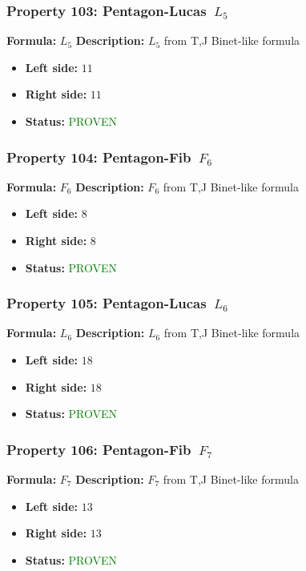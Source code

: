 \subsubsection*{Property 103: Pentagon-Lucas~$L_{5}$}
\textbf{Formula:} $L_5$
\textbf{Description:} $L_{5}$ from T,J Binet-like formula

\begin{itemize}
\item \textbf{Left side:} $11$
\item \textbf{Right side:} $11$
\item \textbf{Status:} \textcolor{green}{PROVEN}
\end{itemize}

\subsubsection*{Property 104: Pentagon-Fib~$F_{6}$}
\textbf{Formula:} $F_6$
\textbf{Description:} $F_{6}$ from T,J Binet-like formula

\begin{itemize}
\item \textbf{Left side:} $8$
\item \textbf{Right side:} $8$
\item \textbf{Status:} \textcolor{green}{PROVEN}
\end{itemize}

\subsubsection*{Property 105: Pentagon-Lucas~$L_{6}$}
\textbf{Formula:} $L_6$
\textbf{Description:} $L_{6}$ from T,J Binet-like formula

\begin{itemize}
\item \textbf{Left side:} $18$
\item \textbf{Right side:} $18$
\item \textbf{Status:} \textcolor{green}{PROVEN}
\end{itemize}

\subsubsection*{Property 106: Pentagon-Fib~$F_{7}$}
\textbf{Formula:} $F_7$
\textbf{Description:} $F_{7}$ from T,J Binet-like formula

\begin{itemize}
\item \textbf{Left side:} $13$
\item \textbf{Right side:} $13$
\item \textbf{Status:} \textcolor{green}{PROVEN}
\end{itemize}

